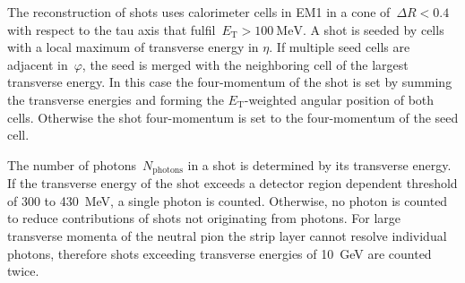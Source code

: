 The reconstruction of shots uses calorimeter cells in EM1 in a cone
of~$\Delta R < 0.4$ with respect to the tau axis that
fulfil~$E_\text{T} > \SI{100}{\MeV}$. A shot is seeded by cells with a local
maximum of transverse energy in $\eta$.
If multiple seed cells are adjacent in~$\varphi$, the seed is merged with the
neighboring cell of the largest transverse energy. In this case the
four-momentum of the shot is set by summing the transverse energies and forming
the $E_\text{T}$-weighted angular position of both cells. Otherwise the shot
four-momentum is set to the four-momentum of the seed cell.

The number of photons~$N_\text{photons}$ in a shot is determined by its
transverse energy. If the transverse energy of the shot exceeds a detector
region dependent threshold of \num{300} to \SI{430}{\MeV}, a single photon is
counted. Otherwise, no photon is counted to reduce contributions of shots not
originating from photons. For large transverse momenta of the neutral pion the
strip layer cannot resolve individual photons, therefore shots exceeding
transverse energies of \SI{10}{\GeV} are counted twice.

